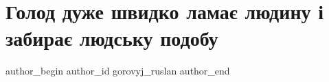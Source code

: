  
 
 
 
 
 
\section{Голод дуже швидко ламає людину і забирає людську подобу}
\label{sec:topics.istoria.ukraina.golodomor.fb.gorovyj_ruslan.1.golod_chelovek}
 
\ifcmt
 author_begin
   author_id gorovyj_ruslan
 author_end
\fi
